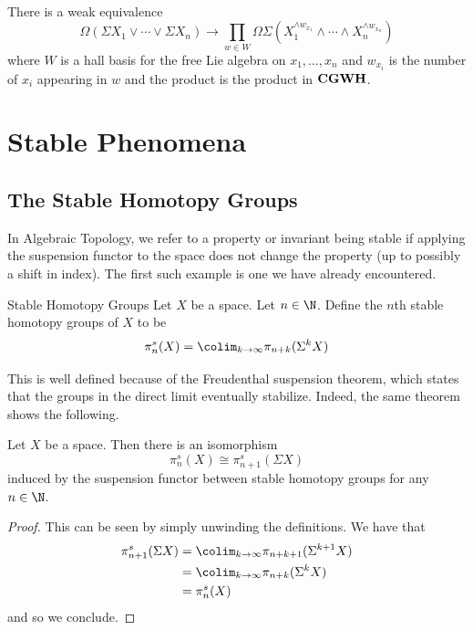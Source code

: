 \documentclass[a4paper]{article}
\begin{document}
\begin{crl}{}{}\\
There is a weak equivalence $$\Omega\left(\Sigma X_1\vee\cdots\vee\Sigma X_n\right)\to\prod_{w\in W}\Omega\Sigma\left(X_1^{\wedge w_{x_1}}\wedge\cdots\wedge X_n^{\wedge w_{x_n}}\right)$$ where $W$ is a hall basis for the free Lie algebra on $x_1,\dots,x_n$ and $w_{x_i}$ is the number of $x_i$ appearing in $w$ and the product is the product in $\bold{CGWH}$. 
\end{crl}

\pagebreak
\section{Stable Phenomena}
\subsection{The Stable Homotopy Groups}
In Algebraic Topology, we refer to a property or invariant being stable if applying the suspension functor to the space does not change the property (up to possibly a shift in index). The first such example is one we have already encountered. 

\begin{defn}{Stable Homotopy Groups}{} Let $X$ be a space. Let $n\in\N$. Define the $n$th stable homotopy groups of $X$ to be $$\pi_n^s(X)=\colim_{k\to\infty}\pi_{n+k}(\Sigma^kX)$$
\end{defn}

This is well defined because of the Freudenthal suspension theorem, which states that the groups in the direct limit eventually stabilize. Indeed, the same theorem shows the following. 

\begin{prp}{}{} Let $X$ be a space. Then there is an isomorphism $$\pi_n^s(X)\cong\pi_{n+1}^s(\Sigma X)$$ induced by the suspension functor between stable homotopy groups for any $n\in\N$. 
\begin{proof}
This can be seen by simply unwinding the definitions. We have that 
\begin{align*}
\pi_{n+1}^s(\Sigma X)&=\colim_{k\to\infty}\pi_{n+k+1}(\Sigma^{k+1}X)\\
&=\colim_{k\to\infty}\pi_{n+k}(\Sigma^kX)\\
&=\pi_n^s(X)
\end{align*}
and so we conclude. 
\end{proof}
\end{prp}
\end{document}
